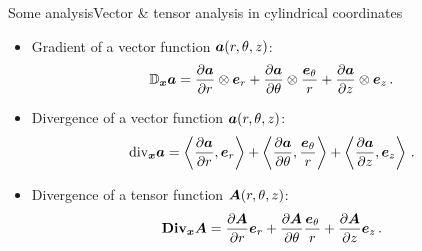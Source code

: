 \begin{frame}{Some analysis}{Vector \& tensor analysis in cylindrical coordinates}

\begin{itemize}
\item Gradient of a vector function ${\boldsymbol{a}}(r,\theta,z)$:
\begin{displaymath}
{{\mathbb D}_{\boldsymbol{x}}}{\boldsymbol{a}}=\frac{\partial{\boldsymbol{a}}}{\partial r}\otimes{\boldsymbol{e}}_r+\frac{\partial{\boldsymbol{a}}}{\partial\theta}\otimes\frac{{\boldsymbol{e}}_\theta}{r}+\frac{\partial{\boldsymbol{a}}}{\partial z}\otimes{\boldsymbol{e}}_z\,.
\end{displaymath}
\item Divergence of a vector function ${\boldsymbol{a}}(r,\theta,z)$:
\begin{displaymath}
{\mathrm{div}_{\boldsymbol{x}}}{\boldsymbol{a}}=\left\langle{\frac{\partial{\boldsymbol{a}}}{\partial r},{\boldsymbol{e}}_r}\right\rangle+\left\langle{\frac{\partial{\boldsymbol{a}}}{\partial\theta},\frac{{\boldsymbol{e}}_\theta}{r}}\right\rangle+\left\langle{\frac{\partial{\boldsymbol{a}}}{\partial z},{\boldsymbol{e}}_z}\right\rangle\,.
\end{displaymath}
\item Divergence of a tensor function ${\boldsymbol{A}}(r,\theta,z)$:
\begin{displaymath}
{\mathbf{Div}_{\boldsymbol{x}}}{\boldsymbol{A}}=\frac{\partial{\boldsymbol{A}}}{\partial r}{\boldsymbol{e}}_r+\frac{\partial{\boldsymbol{A}}}{\partial\theta}\frac{{\boldsymbol{e}}_\theta}{r}+\frac{\partial{\boldsymbol{A}}}{\partial z}{\boldsymbol{e}}_z\,.
\end{displaymath}
\end{itemize}

\end{frame}
